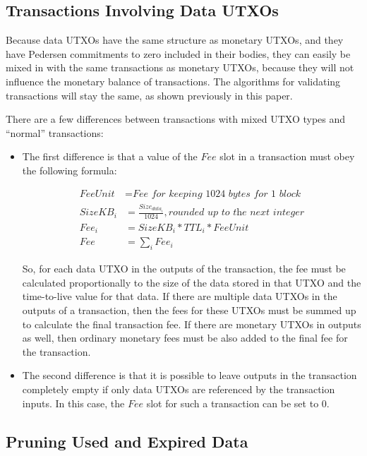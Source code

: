 \documentclass[a4paper, 10pt, conference]{ieeeconf}
\begin{document}
\subsection{Transactions Involving Data UTXOs}

Because data UTXOs have the same structure as monetary UTXOs, and they have Pedersen commitments to zero included in their bodies, they can easily be mixed in with the same transactions as monetary UTXOs, because they will not influence the monetary balance of transactions. The algorithms for validating transactions will stay the same, as shown previously in this paper.

There are a few differences between transactions with mixed UTXO types and ``normal'' transactions:

\begin{itemize}

	\item{The first difference is that a value of the $Fee$ slot in a transaction must obey the following formula:

	\begin{align*}
		FeeUnit &= \textit{Fee for keeping 1024 bytes for 1 block} \\
		SizeKB_i &= \frac{Size_{data_i}}{1024}, \textit{rounded up to the next integer}\\
		Fee_i &= SizeKB_i * TTL_i * FeeUnit\\
		Fee &= \sum_i Fee_i
	\end{align*}

	So, for each data UTXO in the outputs of the transaction, the fee must be calculated proportionally to the size of the data stored in that UTXO and the time-to-live value for that data. If there are multiple data UTXOs in the outputs of a transaction, then the fees for these UTXOs must be summed up to calculate the final transaction fee. If there are monetary UTXOs in outputs as well, then ordinary monetary fees must be also added to the final fee for the transaction.}

	\item{The second difference is that it is possible to leave outputs in the transaction completely empty if only data UTXOs are referenced by the transaction inputs. In this case, the $Fee$ slot for such a transaction can be set to $0$.}
\end{itemize}

\subsection{Pruning Used and Expired Data}
\end{document}
